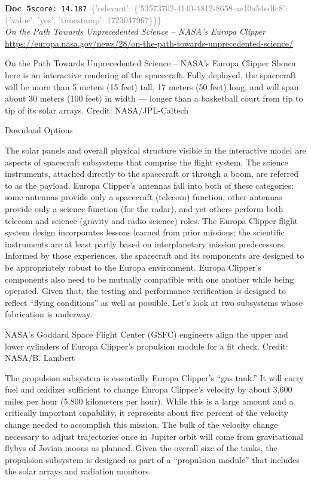 \documentclass[a4paper,11pt]{article}
\begin{document}
\begin{docenv}
{\footnotesize\textcolor{doccolor}{\textbf{Doc~5}}}\hfill{\tiny\texttt{score:~14.187}}\ {\tiny\textcolor{gray}{\{'relevant': \{'53573702-4140-4812-8658-ae10a54edfc8': \{'value': 'yes', 'timestamp': 1723047967\}\}\}}}\\[3pt]
{\small\textit{On the Path Towards Unprecedented Science – NASA's Europa Clipper}}\\[2pt]
{\tiny\url{https://europa.nasa.gov/news/28/on-the-path-towards-unprecedented-science/}}\\[4pt]
{\footnotesize On the Path Towards Unprecedented Science – NASA's Europa Clipper
Shown here is an interactive rendering of the spacecraft. Fully deployed, the spacecraft will be more than 5 meters (15 feet) tall, 17 meters (50 feet) long, and will span about 30 meters (100 feet) in width — longer than a basketball court from tip to tip of its solar arrays. Credit: NASA/JPL-Caltech

Download Options

The solar panels and overall physical structure visible in the interactive model are aspects of spacecraft subsystems that comprise the flight system. The science instruments, attached directly to the spacecraft or through a boom, are referred to as the payload. Europa Clipper’s antennas fall into both of these categories; some antennas provide only a spacecraft (telecom) function, other antennas provide only a science function (for the radar), and yet others perform both telecom and science (gravity and radio science) roles.
The Europa Clipper flight system design incorporates lessons learned from prior missions; the scientific instruments are at least partly based on interplanetary mission predecessors. Informed by those experiences, the spacecraft and its components are designed to be appropriately robust to the Europa environment. Europa Clipper’s components also need to be mutually compatible with one another while being operated. Given that, the testing and performance verification is designed to reflect “flying conditions” as well as possible. Let’s look at two subsystems whose fabrication is underway.

NASA’s Goddard Space Flight Center (GSFC) engineers align the upper and lower cylinders of Europa Clipper’s propulsion module for a fit check. Credit: NASA/B. Lambert

The propulsion subsystem is essentially Europa Clipper’s “gas tank.” It will carry fuel and oxidizer sufficient to change Europa Clipper’s velocity by about 3,600 miles per hour (5,800 kilometers per hour). While this is a large amount and a critically important capability, it represents about five percent of the velocity change needed to accomplish this mission. The bulk of the velocity change necessary to adjust trajectories once in Jupiter orbit will come from gravitational flybys of Jovian moons as planned. Given the overall size of the tanks, the propulsion subsystem is designed as part of a “propulsion module” that includes the solar arrays and radiation monitors.}
\end{docenv}
\end{document}
